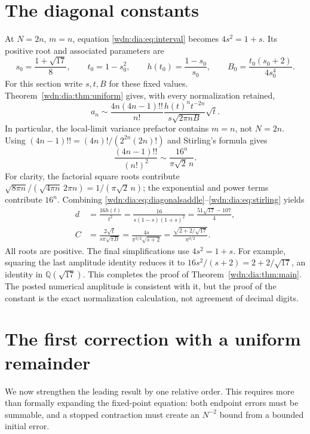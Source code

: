 \documentclass[11pt,letterpaper]{article}
\theoremstyle{remark}\newtheorem{remark}[theorem]{Remark}
\newcommand{\Q}{\mathbb Q}
\begin{document}
\section{The diagonal constants}\label{wdn:dia:sec:constants}
At $N=2n$, $m=n$, equation \eqref{wdn:dia:eq:interval} becomes
$4s^2=1+s$. Its positive root and associated parameters are
\begin{equation}\label{wdn:dia:eq:s0}
 s_0=\frac{1+\sqrt{17}}8,\qquad t_0=1-s_0^2,\qquad
 h(t_0)=\frac{1-s_0}{s_0},\qquad B_0=\frac{t_0(s_0+2)}{4s_0^4}.
\end{equation}
For this section write $s,t,B$ for these fixed values. Theorem~\ref{wdn:dia:thm:uniform}
gives, with every normalization retained,
\begin{equation}\label{wdn:dia:eq:diagonalsaddle}
 a_n\sim\frac{4n(4n-1)!!}{n!}
 \frac{h(t)^nt^{-2n}}{s\sqrt{2\pi nB}}\sqrt t.
\end{equation}
In particular, the local-limit variance prefactor contains $m=n$, not $N=2n$.
Using $(4n-1)!!=(4n)!/(2^{2n}(2n)!)$ and Stirling's formula gives
\begin{equation}\label{wdn:dia:eq:stirling}
 \frac{(4n-1)!!}{(n!)^2}\sim\frac{16^n}{\pi\sqrt2\,n}.
\end{equation}
For clarity, the factorial square roots contribute
$\sqrt{8\pi n}/(\sqrt{4\pi n}\,2\pi n)=1/(\pi\sqrt2\,n)$;
the exponential and power terms contribute $16^n$.
Combining \eqref{wdn:dia:eq:diagonalsaddle}--\eqref{wdn:dia:eq:stirling} yields
\begin{align}
 d&=\frac{16h(t)}{t^2}=\frac{16}{s(1-s)(1+s)^2}
   =\frac{51\sqrt{17}-107}{4},\label{wdn:dia:eq:dconstant}\\
 C&=\frac{2\sqrt t}{s\pi\sqrt{\pi B}}
   =\frac{4s}{\pi^{3/2}\sqrt{s+2}}
   =\frac{\sqrt{2+2/\sqrt{17}}}{\pi^{3/2}}.\label{wdn:dia:eq:Cconstant}
\end{align}
All roots are positive. The final simplifications use $4s^2=1+s$.
For example, squaring the last amplitude identity reduces it to
$16s^2/(s+2)=2+2/\sqrt{17}$, an identity in $\Q(\sqrt{17})$.
This completes the proof of Theorem~\ref{wdn:dia:thm:main}. The posted numerical
amplitude is consistent with it, but the proof of the constant is the
exact normalization calculation, not agreement of decimal digits.

\section{The first correction with a uniform remainder}\label{wdn:dia:sec:correction}
We now strengthen the leading result by one relative order. This requires
more than formally expanding the fixed-point equation: both endpoint errors
must be summable, and a stopped contraction must create an $N^{-2}$ bound
from a bounded initial error.
\end{document}
